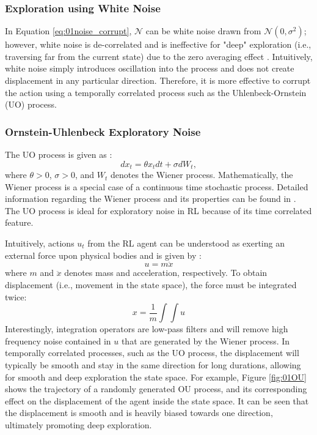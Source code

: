 \subsubsection{Exploration using White Noise}
In Equation \ref{eq:01noise_corrupt}, $\mathcal{N}$ can be white noise drawn from $\mathcal{N}(0, \sigma^2)$; however, white noise is de-correlated and is ineffective for "deep" exploration (i.e., traversing far from the current state) due to the zero averaging effect \cite{white_noise}. Intuitively, white noise simply introduces oscillation into the process and does not create displacement in any particular direction. Therefore, it is more effective to corrupt the action using a temporally correlated process such as the Uhlenbeck-Ornstein (UO) process.

\subsubsection{Ornstein-Uhlenbeck Exploratory Noise}

The UO process is given as \cite{ornstein}:
\begin{equation}
    dx_t = \theta x_t dt + \sigma dW_t,
    \label{eq:01OU}
\end{equation}
where $\theta > 0$, $\sigma > 0$, and $W_t$ denotes the Wiener process. Mathematically, the Wiener process is a special case of a continuous time stochastic process. Detailed information regarding the Wiener process and its properties can be found in \cite{wiener}. The UO process is ideal for exploratory noise in RL because of its time correlated feature.

Intuitively, actions $u_t$ from the RL agent can be understood as exerting an external force upon physical bodies and is given by \cite{physics}:
\begin{equation}
    u = m \ddot{x}
\end{equation}
where $m$ and  $\ddot{x}$ denotes mass and acceleration, respectively.  To obtain displacement (i.e., movement in the state space), the force must be integrated twice:
\begin{equation}
    x = \frac{1}{m}\int \int u
\end{equation}
Interestingly, integration operators are low-pass filters \cite{process_control_ref13} and will remove high frequency noise contained in $u$ that are generated by the Wiener process. In temporally correlated processes, such as the UO process, the displacement will typically be smooth and stay in the same direction for long durations, allowing for smooth and deep exploration the state space. For example, Figure \ref{fig:01OU} shows the trajectory of a randomly generated OU process, and its corresponding effect on the displacement of the agent inside the state space.  It can be seen that the displacement is smooth and is heavily biased towards one direction, ultimately promoting deep exploration.

